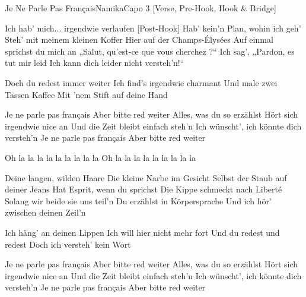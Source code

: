 \begin{song}{Je Ne Parle Pas Français}{Namika}{Capo 3}
[Verse, Pre-Hook, Hook & Bridge]

Ich hab' mich... irgendwie verlaufen
[Post-Hook]
Hab' kein'n Plan, wohin ich geh'
Steh' mit meinem kleinen Koffer
Hier auf der Champs-Élysées
Auf einmal sprichst du mich an
„Salut, qu'est-ce que vous cherchez ?“
Ich sag', „Pardon, es tut mir leid
Ich kann dich leider nicht versteh'n!“

Doch du redest immer weiter
Ich find's irgendwie charmant
Und male zwei Tassen Kaffee
Mit 'nem Stift auf deine Hand

Je ne parle pas français
Aber bitte red weiter
Alles, was du so erzählst
Hört sich irgendwie nice an
Und die Zeit bleibt einfach steh'n
Ich wünscht', ich könnte dich versteh'n
Je ne parle pas français
Aber bitte red weiter

Oh la la la la la la la la la
Oh la la la la la la la la la

Deine langen, wilden Haare
Die kleine Narbe im Gesicht
Selbst der Staub auf deiner Jeans
Hat Esprit, wenn du sprichst
Die Kippe schmeckt nach Liberté
Solang wir beide sie uns teil'n
Du erzählst in Körpersprache
Und ich hör' zwischen deinen Zeil'n

Ich häng' an deinen Lippen
Ich will hier nicht mehr fort
Und du redest und redest
Doch ich versteh' kein Wort

Je ne parle pas français
Aber bitte red weiter
Alles, was du so erzählst
Hört sich irgendwie nice an
Und die Zeit bleibt einfach steh'n
Ich wünscht', ich könnte dich versteh'n
Je ne parle pas français
Aber bitte red weiter


\end{song}
